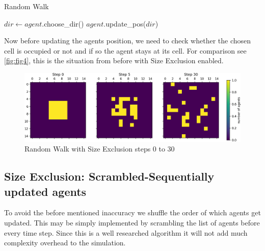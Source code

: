 \begin{algorithm}
\caption{Random Walk}\label{RW_SE}
\begin{algorithmic}[1]
      \State $dir \gets agent.$choose\_dir()
         \State $agent.$update\_pos($dir$)
      \EndIf
   \EndFor
\EndFor
\EndProcedure
\end{algorithmic}
\end{algorithm}

Now before updating the agents position, 
we need to check whether the chosen cell is occupied or not and if so the agent stays at its cell.
For comparison see \autoref{fig:fig4}, this is the situation from before with Size Exclusion enabled.

\begin{figure}
   \begin{center}
   \includegraphics[width=\linewidth]{content/figures/RW_SE_s0-s30.png} 
   \caption{Random Walk with Size Exclusion steps 0 to 30}
   \label{fig:fig4}
   \end{center}
\end{figure}

\subsection{Size Exclusion: Scrambled-Sequentially updated agents}
To avoid the before mentioned inaccuracy we shuffle the order of which agents get updated. 
This may be simply implemented by scrambling the list of agents before every time step.
Since this is a well researched algorithm it will not add much complexity overhead to the simulation. 


